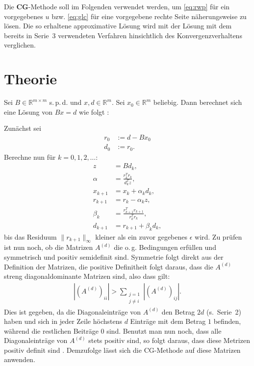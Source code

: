 \documentclass[smallheadings]{scrartcl}
\numberwithin{equation}{section}
\begin{document}
Die \textbf{CG}-Methode soll im Folgenden verwendet werden, um \eqref{eq:rwp} für ein vorgegebenes $u$ bzw. \eqref{eq:glc} für eine vorgegebene rechte Seite näherungsweise zu lösen. Die so erhaltene approximative Lösung wird mit der Lösung mit dem bereits in Serie~3 verwendeten Verfahren hinsichtlich des Konvergenzverhaltens verglichen. 

\section{Theorie}


Sei $B \in \mathbb{R}^{m\times m}$ s.\,p.\,d. und $x,d\in \mathbb{R}^m$. Sei $x_0\in \mathbb{R}^m$ beliebig. Dann berechnet sich eine Lösung von $Bx=d$ wie folgt \cite{wiki:cg}:


Zunächst sei 
\begin{align}
r_0&:=d-Bx_0\\
d_0&:=r_0.
\end{align}
Berechne nun für $k=0,1,2,\dots$:
\begin{align}
z&=Bd_k,\\
\alpha&=\frac{r_k^Tr_k}{d_k^Tz},\\
x_{k+1}&=x_k+\alpha_kd_k,\\
r_{k+1}&=r_k-\alpha_kz,\\
\beta_k&=\frac{r^T_{k+1}r_{k+1}}{r^T_{k}r_{k}},\\
d_{k+1}&=r_{k+1}+\beta_kd_k,
\end{align}
bis das Residuum $\|r_{k+1}\|_\infty$ kleiner als ein zuvor gegebenes $\epsilon$ wird.
Zu prüfen ist nun noch, ob die Matrizen $A^{(d)}$ die o.\,g. Bedingungen erfüllen und symmetrisch und positiv semidefinit sind. Symmetrie folgt direkt aus der Definition der Matrizen, die positive Definitheit folgt daraus, dass die $A^{(d)}$ streng diagonaldominante Matrizen sind, also dass gilt:
\begin{align}
|(A^{(d)})_{ii}|> \sum\limits_{\substack{j=1 \\j\neq i}}|(A^{(d)})_{ij}|.
\end{align}
Dies ist gegeben, da die Diagonaleinträge von $A^{(d)}$ den Betrag $2d$ (s.~Serie~2) haben und sich in jeder Zeile höchstens $d$ Einträge mit dem Betrag $1$ befinden, während die restlichen Beiträge $0$ sind. Benutzt man nun noch, dass alle Diagonaleinträge von $A^{(d)}$ stets positiv sind, so folgt daraus, dass diese Metrizen positiv definit sind \cite{skript:nla}. Demzufolge lässt sich die CG-Methode auf diese Matrizen anwenden. 
\end{document}
